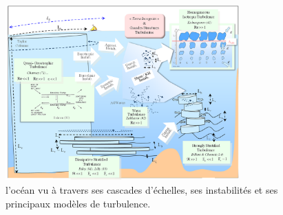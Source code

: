 \begin{figure}[!h]
  \centering
  \includegraphics[width=0.8\textwidth]{./INTRO/Ocean_scales.png}
  \caption{\color{red}l'océan vu à travers ses cascades d'échelles, ses instabilités et ses principaux modèles de turbulence.\color{black}}
  \label{fig_ocean_scales}
\end{figure}

